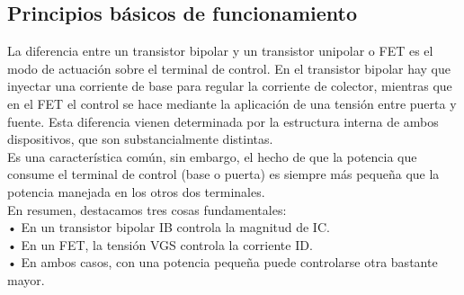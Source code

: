 \documentclass[12pt,a4paper]{article}
\begin{document}
\subsection{Principios básicos de funcionamiento}

La diferencia entre un transistor bipolar y un transistor unipolar o FET es el modo de actuación sobre el terminal de control. En el transistor bipolar hay que inyectar una corriente de base para regular la corriente de colector, mientras que en el FET el control se hace mediante la aplicación de una tensión entre puerta y fuente. Esta diferencia vienen determinada por la estructura interna de ambos dispositivos, que son substancialmente distintas.\\
Es una característica común, sin embargo, el hecho de que la potencia que consume el terminal de control (base o puerta) es siempre más pequeña que la potencia manejada en los otros dos terminales.\\
En resumen, destacamos tres cosas fundamentales:\\
    • En un transistor bipolar I{\tiny B} controla la magnitud de I{\tiny C}.\\
    • En un FET, la tensión V{\tiny GS }controla la corriente I{\tiny D}.\\
    • En ambos casos, con una potencia pequeña puede controlarse otra bastante mayor.\\
\end{document}
